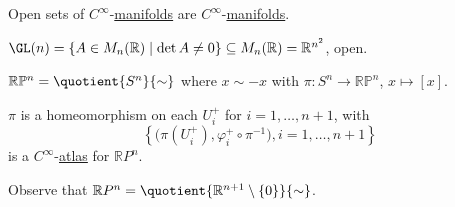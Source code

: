 \begin{eg}
	Open sets of \(C^{\infty} \)-\hyperref[def:smooth-manifold]{manifolds} are \(C^{\infty}\)-\hyperref[def:smooth-manifold]{manifolds}.
\end{eg}

\begin{eg}
	\(\GL (n) = \left\{ A\in M_n(\mathbb{R} ) \mid \det A \neq 0 \right\} \subseteq M_n(\mathbb{R} ) = \mathbb{R} ^{n^2}\), open.
\end{eg}

\begin{eg}
	\(\mathbb{R} \mathbb{P} ^n = \quotient{S^n}{\sim } \) where \(x \sim -x\) with \(\pi \colon S^n \to \mathbb{R} \mathbb{P} ^n\), \(x \mapsto [x]\).
\end{eg}
\begin{explanation}
	\(\pi \) is a homeomorphism on each \(U_i^+\) for \(i=1, \dots , n+1\), with
	\[
		\left\{ \big( \pi (U_i^+), \varphi _i^+ \circ \pi ^{-1} \big), i=1, \dots , n+1 \right\}
	\]
	is a \(C^{\infty} \)-\hyperref[def:differentiable-atlas]{atlas} for \(\mathbb{R} P^n\).
\end{explanation}

\begin{note}
	Observe that \(\mathbb{R} P^n = \quotient{\mathbb{R} ^{n+1} \setminus \left\{ 0 \right\} }{\sim } \).
\end{note}